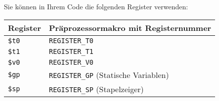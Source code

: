 \documentclass[11pt,a4paper]{article}
\begin{document}
Sie können in Ihrem Code die folgenden Register verwenden:

\vspace{0.5cm}

\begin{tabular}{|l|l|}
\hline
\textbf{Register} & \textbf{Präprozessormakro mit Registernummer} \\
\hline
  \texttt{\$t0} & \texttt{REGISTER\_T0} \\
\hline
  \texttt{\$t1} & \texttt{REGISTER\_T1} \\
\hline
  \texttt{\$v0} & \texttt{REGISTER\_V0} \\
\hline
  \texttt{\$gp} & \texttt{REGISTER\_GP} (Statische Variablen) \\
\hline
  \texttt{\$sp} & \texttt{REGISTER\_SP} (Stapelzeiger) \\
\hline
\end{tabular}
\end{document}
